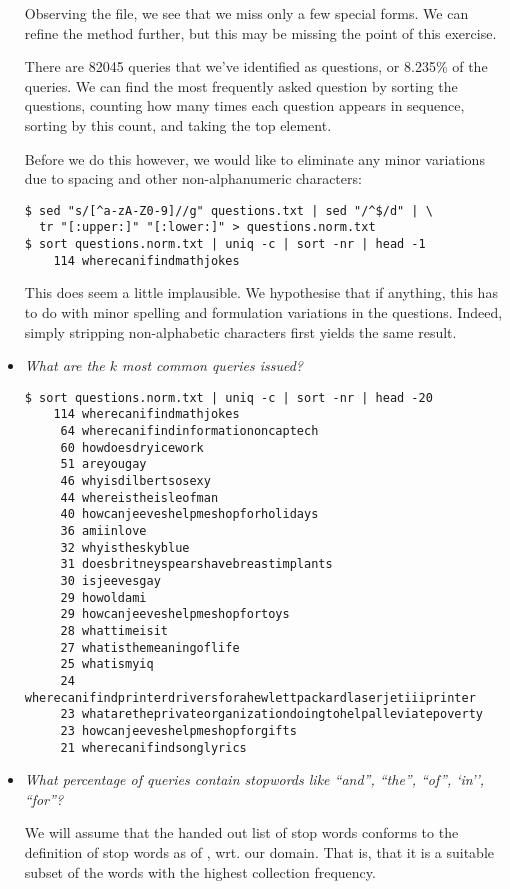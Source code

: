 \begin{itemize}
Observing the file, we see that we miss only a few special forms. We can refine
the method further, but this may be missing the point of this exercise.

There are 82045 queries that we've identified as questions, or 8.235\% of the
queries. We can find the most frequently asked question by sorting the
questions, counting how many times each question appears in sequence, sorting
by this count, and taking the top element.

Before we do this however, we would like to eliminate any minor variations due
to spacing and other non-alphanumeric characters:

\begin{lstlisting}
$ sed "s/[^a-zA-Z0-9]//g" questions.txt | sed "/^$/d" | \
  tr "[:upper:]" "[:lower:]" > questions.norm.txt
$ sort questions.norm.txt | uniq -c | sort -nr | head -1
    114 wherecanifindmathjokes
\end{lstlisting}

This does seem a little implausible. We hypothesise that if anything, this has
to do with minor spelling and formulation variations in the questions. Indeed,
simply stripping non-alphabetic characters first yields the same result.

\item \emph{What are the $k$ most common queries issued?}

\begin{lstlisting}
$ sort questions.norm.txt | uniq -c | sort -nr | head -20
    114 wherecanifindmathjokes
     64 wherecanifindinformationoncaptech
     60 howdoesdryicework
     51 areyougay
     46 whyisdilbertsosexy
     44 whereistheisleofman
     40 howcanjeeveshelpmeshopforholidays
     36 amiinlove
     32 whyistheskyblue
     31 doesbritneyspearshavebreastimplants
     30 isjeevesgay
     29 howoldami
     29 howcanjeeveshelpmeshopfortoys
     28 whattimeisit
     27 whatisthemeaningoflife
     25 whatismyiq
     24 wherecanifindprinterdriversforahewlettpackardlaserjetiiiprinter
     23 whataretheprivateorganizationdoingtohelpalleviatepoverty
     23 howcanjeeveshelpmeshopforgifts
     21 wherecanifindsonglyrics
\end{lstlisting}

\item \emph{What percentage of queries contain stopwords like ``and'', ``the'',
``of'', `in'', ``for''?}

We will assume that the handed out list of stop words conforms to the
definition of stop words as of \cite[\textsection\ 2.2.2 (p. 27)]{irbook}, wrt.
our domain. That is, that it is a suitable subset of the words with the highest
collection frequency.


\end{itemize}
